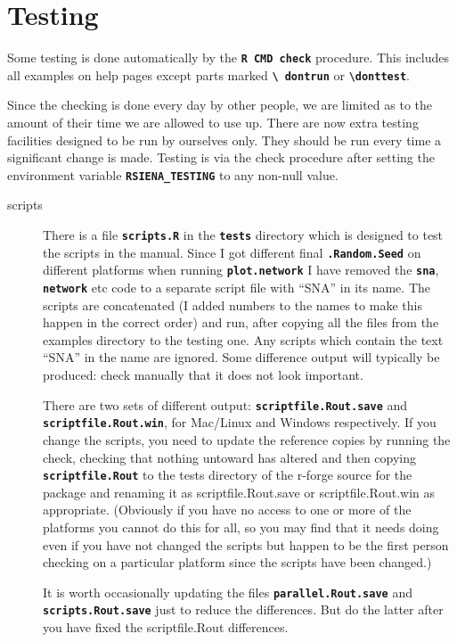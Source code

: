 \documentclass[12pt, a4paper]{article}
\renewcommand{\=}{\,=\,}
\newcommand{\+}{\,+\,}
\newcommand{\sfn}[1]{\textbf{\texttt{#1}}}
\begin{document}
\section{Testing}
Some testing is done automatically  by the \sfn{R CMD check} procedure. This
includes all examples on help pages except parts marked \sfn{\textbackslash
  dontrun} or \sfn{\textbackslash donttest}.

Since the checking is done every day by other people, we are limited as to the
amount of their time we are allowed to use up. There are now extra testing
facilities designed to be run by ourselves only. They should
be run every time a significant change is made.  Testing is via the check
procedure after setting the environment variable \sfn{RSIENA\_TESTING} to any
non-null value.
\label{sec:tests}
\begin{description}
\item[scripts] There is a file \sfn{scripts.R} in the \sfn{tests} directory
  which is designed to test the scripts in the manual. Since I got different
  final \sfn{.Random.Seed} on different platforms when running
  \sfn{plot.network} I have removed the \sfn{sna}, \sfn{network} etc code to a
  separate script file with ``SNA'' in its name.  The
  scripts are concatenated (I added numbers to the names to make this happen in
  the correct order) and run, after copying all the files from the examples
  directory to the testing one. Any scripts which contain the text ``SNA'' in the
  name are ignored. Some difference output will typically be produced: check
  manually that it does not look important.

  There are two sets of different output: \sfn{scriptfile.Rout.save} and
  \sfn{scriptfile.Rout.win}, for Mac/Linux and Windows respectively. If you
  change the scripts, you need to update the reference copies by running the
  check, checking that nothing untoward has altered and then copying
  \sfn{scriptfile.Rout} to the tests directory of the r-forge source for the
  package and renaming it as scriptfile.Rout.save or scriptfile.Rout.win as
  appropriate. (Obviously if you have no access to one or more of the platforms
  you cannot do this for all, so you may find that it needs doing even if you
  have not changed the scripts but happen to be the first person checking on a
  particular platform since the scripts have been changed.)

It is worth occasionally updating the files \sfn{parallel.Rout.save} and
\sfn{scripts.Rout.save} just to reduce the differences. But do the latter after
you have fixed the scriptfile.Rout differences.


\end{description}
\end{document}
